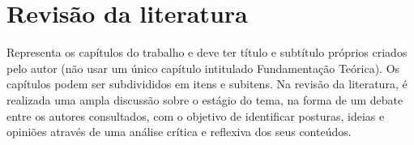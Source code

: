 \section{Revisão da literatura}
Representa os capítulos do trabalho e deve ter título e
subtítulo próprios criados pelo autor (não usar um único capítulo intitulado Fundamentação Teórica). Os capítulos podem ser subdivididos em itens e subitens. Na revisão da literatura, é realizada uma ampla discussão sobre o estágio do tema, na forma de um debate entre os autores consultados, com o objetivo de identificar posturas, ideias e opiniões através de uma análise crítica e reflexiva dos seus conteúdos.